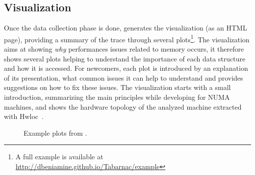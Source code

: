 



\subsection{Visualization}
\label{sec:design-visu}


Once the data collection phase is done,
\TABARNAC generates the visualization (as an HTML page), providing a summary
of the trace through several plots\footnote{A full example is available at
    \url{http://dbeniamine.github.io/Tabarnac/example}}.
The visualization aims at showing \emph{why} performances issues related
to memory occurs, it therefore shows several plots helping to understand the
importance of each data structure and how it is accessed.
For newcomers, each plot is introduced by an explanation
of its presentation, what common issues it can help to understand and provides
suggestions on how to fix these issues.  The visualization starts with a small
introduction, summarizing the main principles while developing for NUMA
machines, and shows the hardware topology of the analyzed machine extracted
with Hwloc~\cite{Broquedis10hwloc}.

\begin{figure*}[ht!]
    \centering
    \caption{Example plots from \TABARNAC.}
    \label{fig:example_plot1}
\end{figure*}


